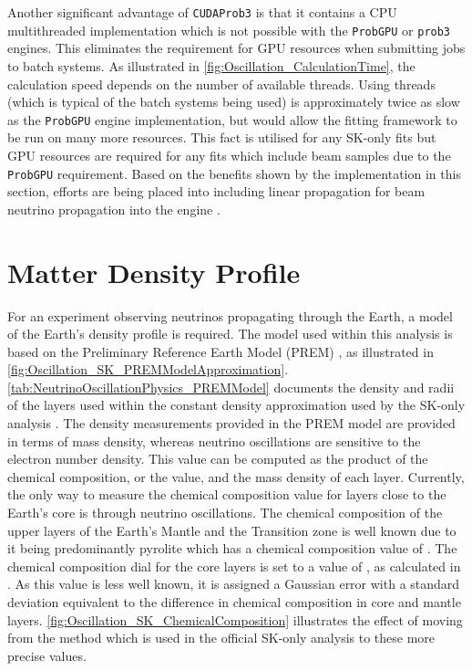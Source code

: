 Another significant advantage of \texttt{CUDAProb3} is that it contains a CPU multithreaded implementation which is not possible with the \texttt{ProbGPU} or \texttt{prob3} engines. This eliminates the requirement for GPU resources when submitting jobs to batch systems. As illustrated in \autoref{fig:Oscillation_CalculationTime}, the calculation speed depends on the number of available threads. Using  threads (which is typical of the batch systems being used) is approximately twice as slow as the \texttt{ProbGPU} engine implementation, but would allow the fitting framework to be run on many more resources. This fact is utilised for any SK-only fits but GPU resources are required for any fits which include beam samples due to the \texttt{ProbGPU} requirement. Based on the benefits shown by the implementation in this section, efforts are being placed into including linear propagation for beam neutrino propagation into the engine \cite{Liban}.

\section{Matter Density Profile}
\label{sec:Oscillation_MatterDensity}


For an experiment observing neutrinos propagating through the Earth, a model of the Earth's density profile is required. The model used within this analysis is based on the Preliminary Reference Earth Model (PREM) \cite{Dziewonski1981-sp}, as illustrated in \autoref{fig:Oscillation_SK_PREMModelApproximation}. \autoref{tab:NeutrinoOscillationPhysics_PREMModel} documents the density and radii of the layers used within the constant density approximation used by the SK-only analysis \cite{thesis_roger}. The density measurements provided in the PREM model are provided in terms of mass density, whereas neutrino oscillations are sensitive to the electron number density. This value can be computed as the product of the chemical composition, or the  value, and the mass density of each layer. Currently, the only way to measure the chemical composition value for layers close to the Earth's core is through neutrino oscillations. The chemical composition of the upper layers of the Earth's Mantle and the Transition zone is well known due to it being predominantly pyrolite which has a chemical composition value of  \cite{Bourret_2017}. The chemical composition dial for the core layers is set to a value of , as calculated in \cite{Rott2015}. As this value is less well known, it is assigned a Gaussian error with a standard deviation equivalent to the difference in chemical composition in core and mantle layers. \autoref{fig:Oscillation_SK_ChemicalComposition} illustrates the effect of moving from the  method which is used in the official SK-only analysis to these more precise values.

